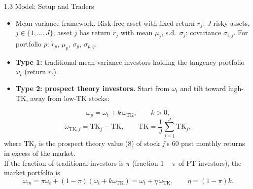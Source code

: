 \documentclass[aspectratio=169, 11pt]{beamer}
\begin{document}
\begin{frame}[shrink=6]{1.3 Model: Setup and Traders}
\begin{itemize}
  \item Mean-variance framework. Risk-free asset with fixed return $r_f$; $J$ risky assets, $j\in\{1,\ldots,J\}$; asset $j$ has return $\tilde{r}_j$ with mean $\mu_j$, s.d.\ $\sigma_j$; covariance $\sigma_{i,j}$. For portfolio $p$: $\tilde{r}_p$, $\mu_p$, $\sigma_p$, $\sigma_{p,q}$.
  \item \textbf{Type 1:} traditional mean-variance investors holding the \alert{tangency portfolio} $\omega_t$ (return $\tilde{r}_t$).
  \item \textbf{Type 2: prospect theory investors.} Start from $\omega_t$ and tilt toward high-TK, away from low-TK stocks:
\end{itemize}
\begin{equation}
\omega_p=\omega_t+k\,\omega_{\mathrm{TK}}, \qquad k>0,
\tag{10}
\end{equation}
\begin{equation}
\omega_{\mathrm{TK},j}=\mathrm{TK}_j-\overline{\mathrm{TK}},
\qquad
\overline{\mathrm{TK}}=\frac{1}{J}\sum_{j=1}^{J}\mathrm{TK}_j,
\tag{11}
\end{equation}
where $\mathrm{TK}_j$ is the prospect theory value (8) of stock $j$'s 60 past monthly returns in excess of the market.\\[0.5em]
If the fraction of traditional investors is $\pi$ (fraction $1-\pi$ of PT investors), the market portfolio is
\begin{equation}
\omega_m=\pi\omega_t+(1-\pi)\left(\omega_t+k\omega_{\mathrm{TK}}\right)=\omega_t+\eta\,\omega_{\mathrm{TK}},
\qquad \eta=(1-\pi)k.
\tag{12}
\end{equation}
\end{frame}
\end{document}
